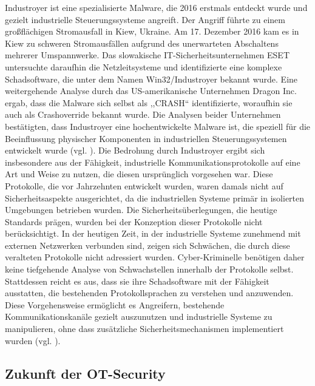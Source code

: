 Industroyer ist eine spezialisierte Malware, die 2016 erstmals entdeckt wurde und gezielt industrielle Steuerungssysteme angreift. Der Angriff führte zu einem großflächigen Stromausfall in Kiew, Ukraine. Am 17. Dezember 2016 kam es in Kiew zu schweren Stromausfällen aufgrund des unerwarteten Abschaltens mehrerer Umspannwerke. Das slowakische IT-Sicherheitsunternehmen ESET untersuchte daraufhin die Netzleitsysteme und identifizierte eine komplexe Schadsoftware, die unter dem Namen Win32/Industroyer bekannt wurde. Eine weitergehende Analyse durch das US-amerikanische Unternehmen Dragon Inc. ergab, dass die Malware sich selbst als ,,CRASH`` identifizierte, woraufhin sie auch als Crashoverride bekannt wurde. Die Analysen beider Unternehmen bestätigten, dass Industroyer eine hochentwickelte Malware ist, die speziell für die Beeinflussung physischer Komponenten in industriellen Steuerungssystemen entwickelt wurde (vgl. \cite{rhebo}). Die Bedrohung durch Industroyer ergibt sich insbesondere aus der Fähigkeit, industrielle Kommunikationsprotokolle auf eine Art und Weise zu nutzen, die diesen ursprünglich vorgesehen war. Diese Protokolle, die vor Jahrzehnten entwickelt wurden, waren damals nicht auf Sicherheitsaspekte ausgerichtet, da die industriellen Systeme primär in isolierten Umgebungen betrieben wurden. Die Sicherheitsüberlegungen, die heutige Standards prägen, wurden bei der Konzeption dieser Protokolle nicht berücksichtigt. In der heutigen Zeit, in der industrielle Systeme zunehmend mit externen Netzwerken verbunden sind, zeigen sich Schwächen, die durch diese veralteten Protokolle nicht adressiert wurden. Cyber-Kriminelle benötigen daher keine tiefgehende Analyse von Schwachstellen innerhalb der Protokolle selbst. Stattdessen reicht es aus, dass sie ihre Schadsoftware mit der Fähigkeit ausstatten, die bestehenden Protokollsprachen zu verstehen und anzuwenden. Diese Vorgehensweise ermöglicht es Angreifern, bestehende Kommunikationskanäle gezielt auszunutzen und industrielle Systeme zu manipulieren, ohne dass zusätzliche Sicherheitsmechanismen implementiert wurden (vgl. \cite{welivesecurity}). 

\subsection{Zukunft der OT-Security}

